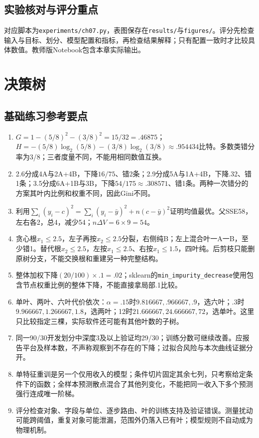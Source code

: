 \section*{实验核对与评分重点}
对应脚本为\texttt{experiments/ch07.py}，表图保存在\texttt{results/}与\texttt{figures/}。评分先检查输入与目标、划分、模型配置和指标，再检查结果解释；只有配置一致时才比较具体数值。教师版Notebook包含本章实际输出。

\chapter{决策树}
\section*{基础练习参考要点}
\begin{enumerate}[label=\arabic*.]
\item $G=1-(5/8)^2-(3/8)^2=15/32=.46875$；$H=-(5/8)\log_2(5/8)-(3/8)\log_2(3/8)\approx.954434$比特。多数类错分率为3/8；三者度量不同，不能用相同数值互换。
\item 2.6分成4A与2A+4B，下降$16/75$、错2条；2.9分成5A与1A+4B，下降.32、错1条；3.5分成6A+1B与3B，下降$54/175\approx.308571$、错1条。两种一次错分的方案其叶内比例和权重不同，因此Gini不同。
\item 利用$\sum_i(y_i-c)^2=\sum_i(y_i-\bar y)^2+n(c-\bar y)^2$证明均值最优。父SSE58，左右各2，总4，减少54；$n\Delta V=6\times9=54$。
\item 贪心根$x_1\le2.5$，左子再按$x_2\le2.5$分裂，右侧纯B；左上混合叶一A一B，至少错1。替代根$x_2\le2.5$，左按$x_1\le2.5$、右按$x_1\le1.5$，四叶纯。后剪枝只能删原树分支，不能交换根和重建另一种完整结构。
\item 整体加权下降$(20/100)\times.1=.02$；sklearn的\texttt{min\_impurity\_decrease}使用包含节点权重比例的整体下降，不能直接拿局部.1比较。
\item 单叶、两叶、六叶代价依次：$\alpha=.15$时$9.816667,.966667,.9$，选六叶；$.3$时$9.966667,1.266667,1.8$，选两叶；12时$21.666667,24.666667,72$，选单叶。这里只比较指定三棵，实际软件还可能有其他叶数的子树。
\item 同一90/30开发划分中深度3及以上验证均29/30；训练分数可继续改善。应报告平台及样本数，不声称观察到不存在的下降；过拟合风险与本次曲线证据分开。
\item 单特征重训是另一个仅用收入的模型；条件切片固定其余七列，只考察给定条件下的函数；全样本预测散点混合了其他列变化，不能把同一收入下多个预测强行连成唯一阶梯。
\item 评分检查对象、字段与单位、逐步路由、叶的训练支持及验证错误。测量扰动可能跨阈值，重复对象可能泄漏，范围外仍落入已有叶；模型规则不自动成为物理机制。
\end{enumerate}
